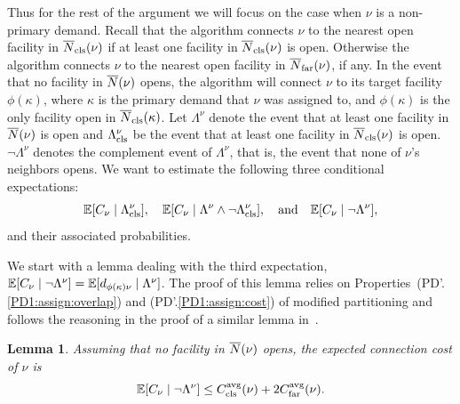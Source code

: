 \documentclass[oneside,final]{ucr}
\newtheorem{lemma}[theorem]{Lemma}
\begin{document}
Thus for the rest of the argument we will focus on the case when $\nu$
is a non-primary demand.  Recall that the
algorithm connects $\nu$ to the nearest open facility in
${\overline{N}}_{{\mbox{\scriptsize\rm cls}}}(\nu)$ if at least one facility in ${\overline{N}}_{{\mbox{\scriptsize\rm cls}}}(\nu)$ is
open. Otherwise the algorithm connects $\nu$ to the nearest open
facility in ${\overline{N}}_{{\mbox{\scriptsize\rm far}}}(\nu)$, if any. In the event that no facility in
${\overline{N}}(\nu)$ opens, the algorithm will connect $\nu$ to its target
facility $\phi(\kappa)$, where $\kappa$ is the primary demand that
$\nu$ was assigned to, and $\phi(\kappa)$ is the only facility open in
${\overline{N}}_{{\mbox{\scriptsize\rm cls}}}(\kappa)$. Let $\Lambda^\nu$ denote the event that at least
one facility in ${\overline{N}}(\nu)$ is open and $\Lambda^\nu_{{\mbox{\scriptsize\rm cls}}}$ be the
event that at least one facility in ${\overline{N}}_{{\mbox{\scriptsize\rm cls}}}(\nu)$ is open.
$\neg \Lambda^\nu$ denotes the complement event of $\Lambda^\nu$, that is,
the event that none of $\nu$'s neighbors opens. 
We want to estimate the following three conditional expectations: 
%
\begin{equation*}
  \mathbb{E}[C_{\nu} \mid
  \Lambda^\nu_{{\mbox{\scriptsize\rm cls}}}],\quad \mathbb{E}[C_{\nu} \mid \Lambda^\nu \wedge \neg
  \Lambda^\nu_{{\mbox{\scriptsize\rm cls}}}], \quad\text{and}\quad \mathbb{E}[C_{\nu} \mid \neg \Lambda^\nu], 
\end{equation*}
%
and their associated probabilities.

We start with a lemma dealing with the third expectation,
$\mathbb{E}[C_\nu\mid\neg \Lambda^{\nu}] = \mathbb{E}[d_{\phi(\kappa)\nu} \mid
\Lambda^{\nu}]$. The proof of this lemma relies on
Properties~(PD'.\ref{PD1:assign:overlap}) and
(PD'.\ref{PD1:assign:cost}) of modified partitioning and follows the
reasoning in the proof of a similar lemma
in~\cite{ByrkaGS10,ByrkaA10}.


\begin{lemma}\label{lem: EBGS target connection cost}
Assuming that no facility in ${\overline{N}}(\nu)$ opens, the expected connection
cost of $\nu$ is
%
\begin{equation}
  \mathbb{E}[C_{\nu} \mid \neg \Lambda^{\nu}] \leq
  C_{{\mbox{\scriptsize\rm cls}}}^{{\mbox{\scriptsize\rm avg}}}(\nu) + 2C_{{\mbox{\scriptsize\rm far}}}^{{\mbox{\scriptsize\rm avg}}}(\nu).
  \label{eqn: expected connection cost target facility}
\end{equation}
%
\end{lemma}
\end{document}
